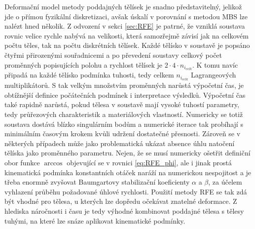 Deformační model metody poddajných tělísek je snadno představitelný, jelikož jde o přímou fyzikální diskretizaci, avšak úskalí v porovnání s metodou MBS lze nalézt hned několik. Z odvození v sekci \ref{sec:RFE} je patrné, že vzniklá soustava rovnic velice rychle nabývá na velikosti, která samozřejmě závisí jak na celkovém počtu těles, tak na počtu diskrétních tělísek. Každé tělísko v soustavě je popsáno čtyřmi přirozenými souřadnicemi a po převedení soustavy celkový počet proměnných popisujících polohu a rychlost tělísek je $ 2\cdot4\cdot n_{i_{celk}} $. K tomu navíc připadá na každé tělísko podmínka tuhosti, tedy celkem $ n_{i_{celk}} $ Lagrangeových multiplikátorů. S tak velkým množstvím proměnných narůstá výpočetní čas, je obtížnější definice počátečních podmínek i interpretace výsledků. Výpočetní čas také rapidně narůstá, pokud tělesa v soustavě mají vysoké tuhostí parametry, tedy průřezových charakteristik a materiálových vlastností. Numericky se totiž soustava dostává blízko singulárním bodům a numerické iterace tak probíhají s minimálním časovým krokem kvůli udržení dostatečné přesnosti. Zároveň se v některých případech může jako problematická ukázat absence úhlu natočení tělíska jako proměnného parametru. Nejen, že se musí numericky ošetřit definiční obor funkce $ \arccos $ objevující se v rovnici \ref{eq:RFE_phi}, ale i jinak prostá kinematická podmínka konstantních otáček naráží na numerickou nespojitost a je třeba enormně zvyšovat Baumgartovy stabilizační koeficienty $ \alpha $ a $ \beta $, za účelem vyhlazení průběhu požadované úhlové rychlosti. Použití metody RFE se tak zdá být vhodné pro tělesa, u kterých lze dopředu očekávat znatelné deformace. Z hlediska náročnosti i času je tedy výhodné kombinovat poddajné tělesa s tělesy tuhými, na které lze snáze aplikovat kinematické podmínky.

